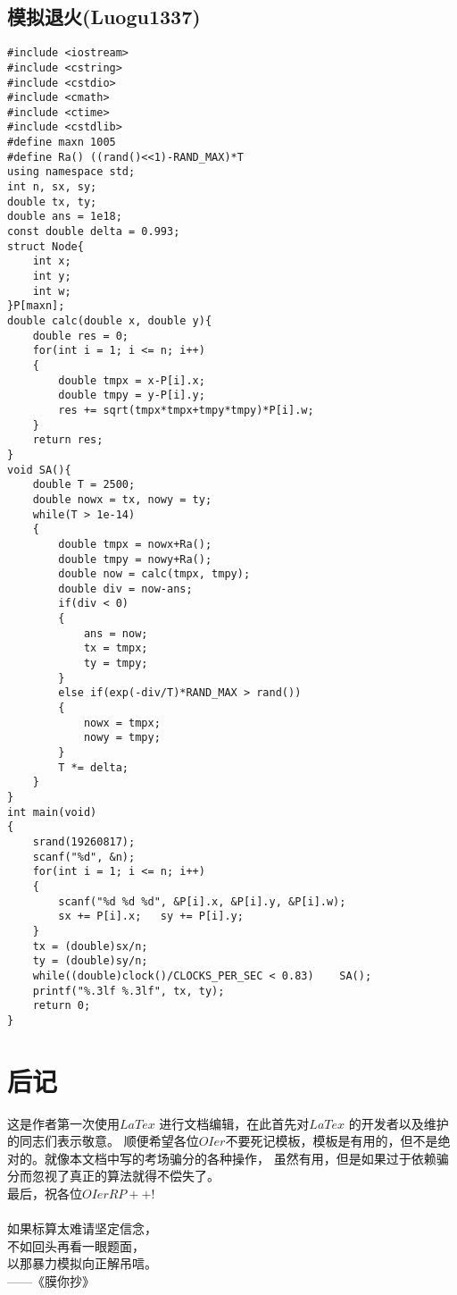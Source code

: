 \documentclass[UTF8]{ctexart}
\begin{document}
	\subsection{模拟退火(Luogu1337)}
	{\setmainfont{Consolas}
\begin{lstlisting}
#include <iostream>
#include <cstring>
#include <cstdio>
#include <cmath>
#include <ctime>
#include <cstdlib>
#define maxn 1005
#define Ra() ((rand()<<1)-RAND_MAX)*T
using namespace std;
int n, sx, sy;
double tx, ty;
double ans = 1e18;
const double delta = 0.993;
struct Node{
    int x;
    int y;
    int w;
}P[maxn];
double calc(double x, double y){
    double res = 0;
    for(int i = 1; i <= n; i++)
    {
        double tmpx = x-P[i].x;
        double tmpy = y-P[i].y;
        res += sqrt(tmpx*tmpx+tmpy*tmpy)*P[i].w;
    }
    return res;
}
void SA(){
    double T = 2500;
    double nowx = tx, nowy = ty;
    while(T > 1e-14)
    {
        double tmpx = nowx+Ra();
        double tmpy = nowy+Ra();
        double now = calc(tmpx, tmpy);
        double div = now-ans;
        if(div < 0)
        {
            ans = now;
            tx = tmpx;
            ty = tmpy;
        }
        else if(exp(-div/T)*RAND_MAX > rand())
        {
            nowx = tmpx;
            nowy = tmpy;
        }
        T *= delta;
    }
}
int main(void)
{
    srand(19260817);
    scanf("%d", &n);
    for(int i = 1; i <= n; i++)
    {
        scanf("%d %d %d", &P[i].x, &P[i].y, &P[i].w);
        sx += P[i].x;	sy += P[i].y;
    }
    tx = (double)sx/n;
    ty = (double)sy/n;
    while((double)clock()/CLOCKS_PER_SEC < 0.83)	SA();
    printf("%.3lf %.3lf", tx, ty);
    return 0;
}
\end{lstlisting}}
\newpage
	\section{后记}
	{\setmainfont{Microsoft YaHei}
	\Large{
	这是作者第一次使用$LaTex$ 进行文档编辑，在此首先对$LaTex$ 的开发者以及维护的同志们表示敬意。
	顺便希望各位$OIer$不要死记模板，模板是有用的，但不是绝对的。就像本文档中写的考场骗分的各种操作，
	虽然有用，但是如果过于依赖骗分而忽视了真正的算法就得不偿失了。\\
	\indent 最后，祝各位$OIer RP++$!\\}
	\small{\\如果标算太难请坚定信念，\\
	不如回头再看一眼题面，\\
	以那暴力模拟向正解吊唁。\\
	\indent \indent \indent ——《膜你抄》}}
\end{document}
